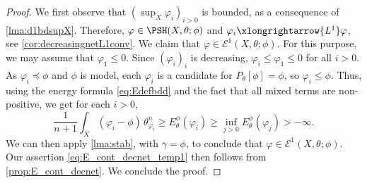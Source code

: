 \begin{proof}
    We first observe that $(\sup_X \varphi_i)_{i>0}$ is bounded, as a consequence of \cref{lma:d1bdsupX}. Therefore, $\varphi\in \PSH(X,\theta;\phi)$ and $\varphi_i\xlongrightarrow{L^1} \varphi$, see \cref{cor:decreasingnetL1conv}. We claim that $\varphi\in \mathcal{E}^1(X,\theta;\phi)$. For this purpose, we may assume that $\varphi_1\leq 0$.
    Since $(\varphi_i)_i$ is decreasing, $\varphi_i\leq \varphi_1\leq 0$ for all $i>0$. As $\varphi_i\preceq\phi$ and $\phi$ is model, each $\varphi_i$ is a candidate for $P_\theta[\phi]=\phi$, so $\varphi_i\leq \phi$. Thus, using the energy formula \eqref{eq:Edefbdd} and the fact that all mixed terms are non-positive, we get for each $i>0$,
    \[
        \frac{1}{n+1}\int_X \left(\varphi_i-\phi\right)\,\theta_{\varphi_i}^n\geq E_{\theta}^{\phi}(\varphi_i)\geq \inf_{j>0} E_{\theta}^{\phi}(\varphi_j)>-\infty.
    \]
    We can then apply \cref{lma:stab}, with $\gamma=\phi$, to conclude that $\varphi\in \mathcal{E}^1(X,\theta;\phi)$.
    Our assertion \eqref{eq:E_cont_decnet_temp1} then follows from \cref{prop:E_cont_decnet}. We conclude the proof.
\end{proof}

